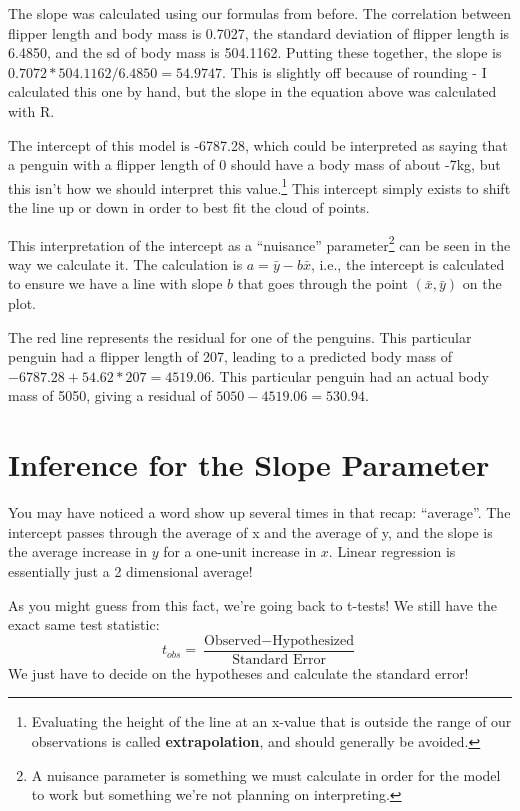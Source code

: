 \documentclass[
  letterpaper,
  DIV=11,
  numbers=noendperiod,
  oneside]{scrreprt}
\begin{document}
The slope was calculated using our formulas from before. The correlation
between flipper length and body mass is 0.7027, the standard deviation
of flipper length is 6.4850, and the sd of body mass is 504.1162.
Putting these together, the slope is
\(0.7072 * 504.1162 / 6.4850 = 54.9747\). This is slightly off because
of rounding - I calculated this one by hand, but the slope in the
equation above was calculated with R.

The intercept of this model is -6787.28, which could be interpreted as
saying that a penguin with a flipper length of 0 should have a body mass
of about -7kg, but this isn't how we should interpret this
value.\footnote{Evaluating the height of the line at an x-value that is
  outside the range of our observations is called
  \textbf{extrapolation}, and should generally be avoided.} This
intercept simply exists to shift the line up or down in order to best
fit the cloud of points.

This interpretation of the intercept as a ``nuisance''
parameter\footnote{A nuisance parameter is something we must calculate
  in order for the model to work but something we're not planning on
  interpreting.} can be seen in the way we calculate it. The calculation
is \(a = \bar y - b\bar x\), i.e., the intercept is calculated to ensure
we have a line with slope \(b\) that goes through the point
\((\bar x, \bar y)\) on the plot.

The red line represents the residual for one of the penguins. This
particular penguin had a flipper length of 207, leading to a predicted
body mass of \(-6787.28 + 54.62*207 = 4519.06\). This particular penguin
had an actual body mass of 5050, giving a residual of
\(5050 - 4519.06 = 530.94\).

\hypertarget{inference-for-the-slope-parameter}{%
\section{Inference for the Slope
Parameter}\label{inference-for-the-slope-parameter}}

You may have noticed a word show up several times in that recap:
``average''. The intercept passes through the average of x and the
average of y, and the slope is the average increase in \(y\) for a
one-unit increase in \(x\). Linear regression is essentially just a 2
dimensional average!

As you might guess from this fact, we're going back to t-tests! We still
have the exact same test statistic: \[
t_{obs} = \frac{\text{Observed} - \text{Hypothesized}}{\text{Standard Error}}
\] We just have to decide on the hypotheses and calculate the standard
error!
\end{document}

